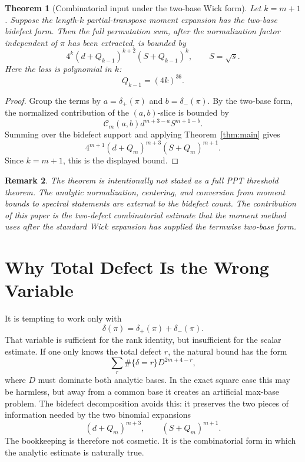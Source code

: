 \documentclass[11pt]{article}
\numberwithin{equation}{section}
\newtheorem{theorem}{Theorem}[section]
\newtheorem{remark}[theorem]{Remark}
\newcommand{\dd}{\delta}
\newcommand{\ddp}{\delta_{+}}
\newcommand{\ddm}{\delta_{-}}
\newcommand{\Count}{\mathcal C}
\newcommand{\Loss}{Q}
\begin{document}
\begin{theorem}[Combinatorial input under the two-base Wick form]\label{thm:aubrun-input}
Let \(k=m+1\).  Suppose the length-\(k\) partial-transpose moment expansion
has the two-base bidefect form.  Then the full permutation sum, after the
normalization factor independent of \(\pi\) has been extracted, is bounded by
\[
  4^k(d+\Loss_{k-1})^{k+2}(S+\Loss_{k-1})^k,
  \qquad S=\sqrt{s}.
\]
Here the loss is polynomial in \(k\):
\[
  \Loss_{k-1}=(4k)^{36}.
\]
\end{theorem}

\begin{proof}
Group the terms by \(a=\ddp(\pi)\) and \(b=\ddm(\pi)\).  By the two-base
form, the normalized contribution of the \((a,b)\)-slice is bounded by
\[
  \Count_m(a,b)d^{m+3-a}S^{m+1-b}.
\]
Summing over the bidefect support and applying Theorem~\ref{thm:main} gives
\[
  4^{m+1}(d+\Loss_m)^{m+3}(S+\Loss_m)^{m+1}.
\]
Since \(k=m+1\), this is the displayed bound.
\end{proof}

\begin{remark}
The theorem is intentionally not stated as a full PPT threshold theorem.  The
analytic normalization, centering, and conversion from moment bounds to
spectral statements are external to the bidefect count.  The contribution of
this paper is the two-defect combinatorial estimate that the moment method
uses after the standard Wick expansion has supplied the termwise two-base
form.
\end{remark}

\section{Why Total Defect Is the Wrong Variable}

It is tempting to work only with
\[
  \dd(\pi)=\ddp(\pi)+\ddm(\pi).
\]
That variable is sufficient for the rank identity, but insufficient for the
scalar estimate.  If one only knows the total defect \(r\), the natural bound
has the form
\[
  \sum_{r}\#\{\dd=r\}D^{2m+4-r},
\]
where \(D\) must dominate both analytic bases.  In the exact square case this
may be harmless, but away from a common base it creates an artificial
max-base problem.  The bidefect decomposition avoids this: it preserves the
two pieces of information needed by the two binomial expansions
\[
  (d+\Loss_m)^{m+3},
  \qquad
  (S+\Loss_m)^{m+1}.
\]
The bookkeeping is therefore not cosmetic.  It is the combinatorial form in
which the analytic estimate is naturally true.



\end{document}
